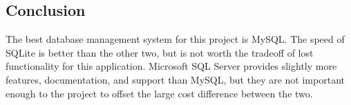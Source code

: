 \documentclass[onecolumn, draftclsnofoot,10pt, compsoc]{IEEEtran}
\begin{document}
\subsection{Conclusion}
The best database management system for this project is MySQL. The speed of SQLite is better than the other two, but is not worth the tradeoff of lost functionality for this application. Microsoft SQL Server provides slightly more features, documentation, and support than MySQL, but they are not important enough to the project to offset the large cost difference between the two.

\newpage


\end{document}
